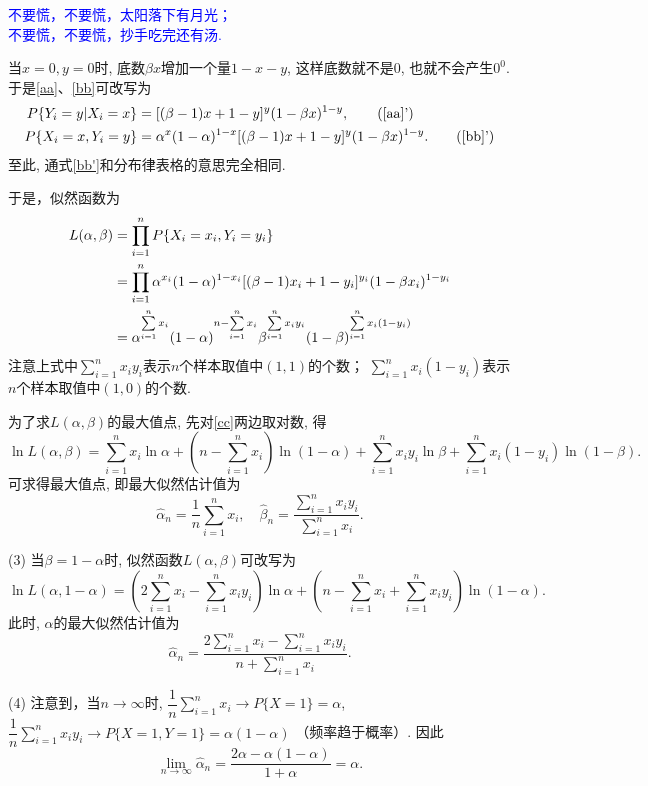 \begin{center}
\textcolor{blue}{\hei
不要慌，不要慌，太阳落下有月光；\\
不要慌，不要慌，抄手吃完还有汤.}
\end{center}

当$x=0,y=0$时, 底数$\beta x$增加一个量$1-x-y$, 这样底数就不是$0$, 也就不会产生$0^0$.
于是\eqref{aa}、\eqref{bb}可改写为
\begin{subequations}
	\begin{align}
		P\{Y_i=y|X_i=x\}&=[(\beta-1)x+1-y]^{y}(1-\beta x)^{1-y}, \tag{\ref{aa}'} \label{aa'}\\
		P\{X_i=x,Y_i=y\}&=\alpha^{x}(1-\alpha)^{1-x}[(\beta-1)x+1-y]^{y}(1-\beta x)^{1-y}.\tag{\ref{bb}'}  \label{bb'}
	\end{align}
\end{subequations}
至此, 通式\eqref{bb'}和分布律表格的意思完全相同.

于是，似然函数为
\begin{align}
L(\alpha,\beta)
&=\prod_{i=1}^n P\{X_i=x_i,Y_i=y_i\} \notag\\
&=\prod_{i=1}^n \alpha^{x_i}(1-\alpha)^{1-x_i}[(\beta-1)x_i+1-y_i]^{y_i}(1-\beta x_i)^{1-y_i} \notag\\
&= \alpha^{\sum\limits_{i=1}^n x_i}(1-\alpha)^{n-\sum\limits_{i=1}^n x_i}\beta^{\sum\limits_{i=1}^n x_iy_i}(1-\beta)^{\sum\limits_{i=1}^n x_i(1-y_i)} \label{cc}
\end{align}
%
注意上式中$\sum\limits_{i=1}^n x_iy_i$表示$n$个样本取值中$(1,1)$的个数；
$\sum\limits_{i=1}^n x_i(1-y_i)$表示$n$个样本取值中$(1,0)$的个数.

为了求$L(\alpha,\beta)$的最大值点, 先对\eqref{cc}两边取对数, 得
$$
\ln L(\alpha,\beta)=
{\sum\limits_{i=1}^n x_i}\ln\alpha
+(n-\sum\limits_{i=1}^n x_i)\ln(1-\alpha)
+{\sum\limits_{i=1}^n x_iy_i}\ln\beta
+{\sum\limits_{i=1}^n x_i(1-y_i)}\ln(1-\beta).
$$
可求得最大值点, 即最大似然估计值为
$$
\hat{\alpha}_n=\frac{1}{n}\sum\limits_{i=1}^n x_i,\quad
\hat{\beta}_n=\frac{\sum\limits_{i=1}^n x_iy_i}{\sum\limits_{i=1}^n x_i}.
$$

(3)
当$\beta=1-\alpha$时, 似然函数$L(\alpha,\beta)$可改写为
$$
\ln L(\alpha,1-\alpha)=
(2\sum\limits_{i=1}^n x_i-\sum\limits_{i=1}^n x_iy_i)\ln\alpha
+(n-\sum\limits_{i=1}^n x_i+\sum\limits_{i=1}^n x_iy_i)\ln(1-\alpha).
$$
此时, $\alpha$的最大似然估计值为
$$
\hat{\alpha}_n=\frac{2\sum\limits_{i=1}^n x_i-\sum\limits_{i=1}^n x_iy_i}{n+\sum\limits_{i=1}^n x_i}.
$$

(4) 注意到，当$n\to \infty$时, $\dfrac{1}{n}\sum\limits_{i=1}^n x_i\to P\{X=1\}=\alpha$,
$\dfrac{1}{n}\sum\limits_{i=1}^n x_iy_i\to P\{X=1,Y=1\}=\alpha(1-\alpha)$ （频率趋于概率）.
因此
$$
\lim_{n\to\infty}\hat{\alpha}_n=\frac{2\alpha-\alpha(1-\alpha)}{1+\alpha}=\alpha.
$$



